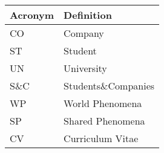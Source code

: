\begin{table}[H]
    \centering
    \begin{longtable}{|l|p{}|}
        \hline
        \textbf{Acronym} & \textbf{Definition} \\
        \hline \hline
        CO               & Company             \\
        \hline
        ST               & Student             \\
        \hline
        UN               & University          \\
        \hline
        S\&C             & Students\&Companies \\
        \hline
        WP               & World Phenomena     \\
        \hline
        SP               & Shared Phenomena    \\
        \hline
        CV               & Curriculum Vitae    \\
        \hline
    \end{longtable}
\end{table}
